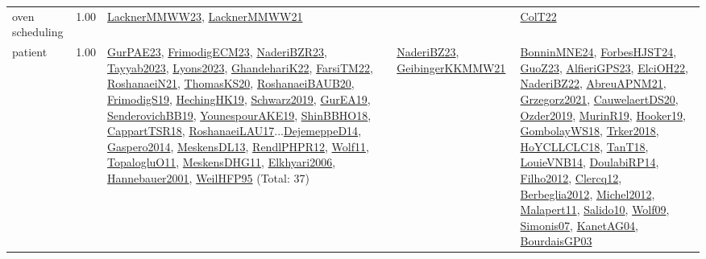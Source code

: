 {\begin{longtable}{p{3cm}r>{\raggedright\arraybackslash}p{6cm}>{\raggedright\arraybackslash}p{6cm}>{\raggedright\arraybackslash}p{8cm}}
\index{oven scheduling}\index{ApplicationAreas!oven scheduling}oven scheduling &  1.00 & \hyperref[detail:LacknerMMWW23]{LacknerMMWW23}, \hyperref[detail:LacknerMMWW21]{LacknerMMWW21} &  & \hyperref[detail:ColT22]{ColT22}\\
\index{patient}\index{ApplicationAreas!patient}patient &  1.00 & \hyperref[detail:GurPAE23]{GurPAE23}, \hyperref[detail:FrimodigECM23]{FrimodigECM23}, \hyperref[detail:NaderiBZR23]{NaderiBZR23}, \hyperref[detail:Tayyab2023]{Tayyab2023}, \hyperref[detail:Lyons2023]{Lyons2023}, \hyperref[detail:GhandehariK22]{GhandehariK22}, \hyperref[detail:FarsiTM22]{FarsiTM22}, \hyperref[detail:RoshanaeiN21]{RoshanaeiN21}, \hyperref[detail:ThomasKS20]{ThomasKS20}, \hyperref[detail:RoshanaeiBAUB20]{RoshanaeiBAUB20}, \hyperref[detail:FrimodigS19]{FrimodigS19}, \hyperref[detail:HechingHK19]{HechingHK19}, \hyperref[detail:Schwarz2019]{Schwarz2019}, \hyperref[detail:GurEA19]{GurEA19}, \hyperref[detail:SenderovichBB19]{SenderovichBB19}, \hyperref[detail:YounespourAKE19]{YounespourAKE19}, \hyperref[detail:ShinBBHO18]{ShinBBHO18}, \hyperref[detail:CappartTSR18]{CappartTSR18}, \hyperref[detail:RoshanaeiLAU17]{RoshanaeiLAU17}...\hyperref[detail:DejemeppeD14]{DejemeppeD14}, \hyperref[detail:Gaspero2014]{Gaspero2014}, \hyperref[detail:MeskensDL13]{MeskensDL13}, \hyperref[detail:RendlPHPR12]{RendlPHPR12}, \hyperref[detail:Wolf11]{Wolf11}, \hyperref[detail:TopalogluO11]{TopalogluO11}, \hyperref[detail:MeskensDHG11]{MeskensDHG11}, \hyperref[detail:Elkhyari2006]{Elkhyari2006}, \hyperref[detail:Hannebauer2001]{Hannebauer2001}, \hyperref[detail:WeilHFP95]{WeilHFP95} (Total: 37) & \hyperref[detail:NaderiBZ23]{NaderiBZ23}, \hyperref[detail:GeibingerKKMMW21]{GeibingerKKMMW21} & \hyperref[detail:BonninMNE24]{BonninMNE24}, \hyperref[detail:ForbesHJST24]{ForbesHJST24}, \hyperref[detail:GuoZ23]{GuoZ23}, \hyperref[detail:AlfieriGPS23]{AlfieriGPS23}, \hyperref[detail:ElciOH22]{ElciOH22}, \hyperref[detail:NaderiBZ22]{NaderiBZ22}, \hyperref[detail:AbreuAPNM21]{AbreuAPNM21}, \hyperref[detail:Grzegorz2021]{Grzegorz2021}, \hyperref[detail:CauwelaertDS20]{CauwelaertDS20}, \hyperref[detail:Ozder2019]{Ozder2019}, \hyperref[detail:MurinR19]{MurinR19}, \hyperref[detail:Hooker19]{Hooker19}, \hyperref[detail:GombolayWS18]{GombolayWS18}, \hyperref[detail:Trker2018]{Trker2018}, \hyperref[detail:HoYCLLCLC18]{HoYCLLCLC18}, \hyperref[detail:TanT18]{TanT18}, \hyperref[detail:LouieVNB14]{LouieVNB14}, \hyperref[detail:DoulabiRP14]{DoulabiRP14}, \hyperref[detail:Filho2012]{Filho2012}, \hyperref[detail:Clercq12]{Clercq12}, \hyperref[detail:Berbeglia2012]{Berbeglia2012}, \hyperref[detail:Michel2012]{Michel2012}, \hyperref[detail:Malapert11]{Malapert11}, \hyperref[detail:Salido10]{Salido10}, \hyperref[detail:Wolf09]{Wolf09}, \hyperref[detail:Simonis07]{Simonis07}, \hyperref[detail:KanetAG04]{KanetAG04}, \hyperref[detail:BourdaisGP03]{BourdaisGP03}\\

\end{longtable}}
